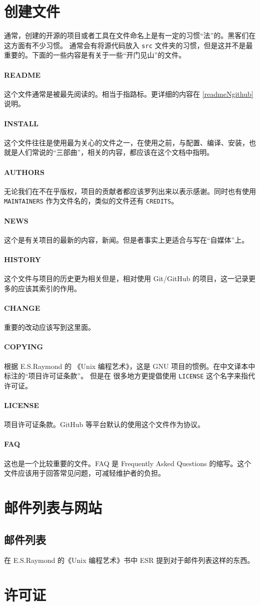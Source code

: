\documentclass{ctexart}
\begin{document}
\section{创建文件}
通常，创建的开源的项目或者工具在文件命名上是有一定的习惯“法”的。黑客们在这方面有不少习惯。
通常会有将源代码放入 \verb|src| 文件夹的习惯，但是这并不是最重要的。下面的一些内容是有关于一些“开门见山”的文件。
\paragraph{README}
这个文件通常是被最先阅读的。相当于指路标。更详细的内容在 \ref{readmeNgithub} 说明。
\paragraph{INSTALL}
这个文件往往是使用最为关心的文件之一，在使用之前，与配置、编译、安装，也就是人们常说的“三部曲”，相关的内容，都应该在这个文档中指明。
\paragraph{AUTHORS}
无论我们在不在乎版权，项目的贡献者都应该罗列出来以表示感谢。同时也有使用 \verb|MAINTAINERS| 作为文件名的，类似的文件还有 \verb|CREDITS|。
\paragraph{NEWS}
这个是有关项目的最新的内容，新闻。但是者事实上更适合与写在“自媒体”上。
\paragraph{HISTORY}
这个文件与项目的历史更为相关但是，相对使用 Git/GitHub 的项目，这一记录更多的应该其索引的作用。
\paragraph{CHANGE}
重要的改动应该写到这里面。
\paragraph{COPYING}
根据 E.S.Raymond 的 《Unix 编程艺术》，这是 GNU 项目的惯例。在中文译本中标注的“项目许可证条款”。
但是在 很多地方更提倡使用 \verb|LICENSE| 这个名字来指代许可证。
\paragraph{LICENSE}
项目许可证条款。GitHub 等平台默认的使用这个文件作为协议。
\paragraph{FAQ}
这也是一个比较重要的文件。FAQ 是 Frequently Asked Questions 的缩写。这个文件应该用于回答常见问题，可减轻维护者的负担。


\section{邮件列表与网站}
\subsection{邮件列表}
在 E.S.Raymond 的《Unix 编程艺术》书中 ESR 提到对于邮件列表这样的东西。


\section{许可证}
\end{document}
